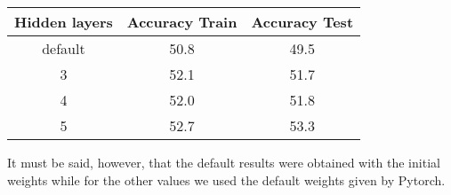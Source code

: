 \documentclass{article}
\begin{document}
\begin{center}
\begin{table}[!h]
\begin{tabular}{|c|c|c|}
\hline
\textbf{Hidden layers} & \textbf{Accuracy Train} & \textbf{Accuracy Test} \\ \hline
default                & 50.8 &	49.5                     \\ \hline
3                      & 52.1&  51.7                  \\ \hline
4                     & 52.0&	51.8                   \\ \hline
5                      &52.7&	53.3                      \\ \hline
\end{tabular}
\end{table}
\end{center}

It must be said, however, that the default results were obtained with the initial weights while for the other values we used the default weights given by Pytorch.
\end{document}
